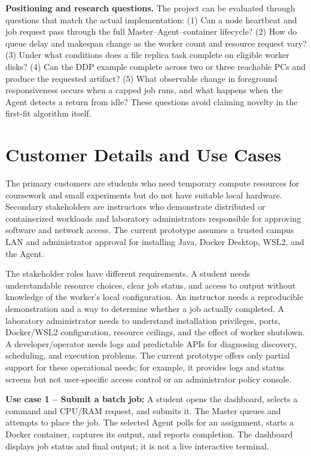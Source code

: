 \documentclass{article}
\begin{document}
\textbf{Positioning and research questions.} The project can be evaluated through questions that match the actual implementation: (1) Can a node heartbeat and job request pass through the full Master--Agent--container lifecycle? (2) How do queue delay and makespan change as the worker count and resource request vary? (3) Under what conditions does a file replica task complete on eligible worker disks? (4) Can the DDP example complete across two or three reachable PCs and produce the requested artifact? (5) What observable change in foreground responsiveness occurs when a capped job runs, and what happens when the Agent detects a return from idle? These questions avoid claiming novelty in the first-fit algorithm itself.
    \pagebreak
    \section{Customer Details and Use Cases}
The primary customers are students who need temporary compute resources for coursework and small experiments but do not have suitable local hardware. Secondary stakeholders are instructors who demonstrate distributed or containerized workloads and laboratory administrators responsible for approving software and network access. The current prototype assumes a trusted campus LAN and administrator approval for installing Java, Docker Desktop, WSL2, and the Agent.

The stakeholder roles have different requirements. A student needs understandable resource choices, clear job status, and access to output without knowledge of the worker's local configuration. An instructor needs a reproducible demonstration and a way to determine whether a job actually completed. A laboratory administrator needs to understand installation privileges, ports, Docker/WSL2 configuration, resource ceilings, and the effect of worker shutdown. A developer/operator needs logs and predictable APIs for diagnosing discovery, scheduling, and execution problems. The current prototype offers only partial support for these operational needs; for example, it provides logs and status screens but not user-specific access control or an administrator policy console.

\textbf{Use case 1 -- Submit a batch job:} A student opens the dashboard, selects a command and CPU/RAM request, and submits it. The Master queues and attempts to place the job. The selected Agent polls for an assignment, starts a Docker container, captures its output, and reports completion. The dashboard displays job status and final output; it is not a live interactive terminal.
\end{document}
